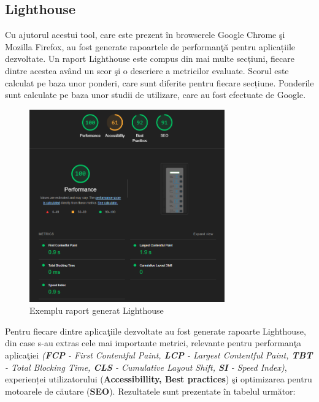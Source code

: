 \documentclass[12pt, a4paper]{report}
\begin{document}
\subsection{Lighthouse}

Cu ajutorul acestui tool, care este prezent în browserele Google Chrome \c si Mozilla Firefox, au fost generate rapoartele de performan\c t\u a pentru aplicațiile dezvoltate. Un raport Lighthouse este compus din mai multe secțiuni, fiecare dintre acestea av\^and un scor \c si o descriere a metricilor evaluate. Scorul este calculat pe baza unor ponderi, care sunt diferite pentru fiecare secțiune. Ponderile sunt calculate pe baza unor studii de utilizare, care au fost efectuate de Google.

\begin{figure}[htbp]
	\centering
	\includegraphics[width=0.75\textwidth]{01_mobile_lighthouse.png}
	\caption{Exemplu raport generat Lighthouse}
	\label{fig:lighthouse-example}
\end{figure}

Pentru fiecare dintre aplica\c tiile dezvoltate au fost generate rapoarte Lighthouse, din case s-au extras cele mai importante metrici, relevante pentru performan\c ta aplica\c tiei \textit{(\textbf{FCP} - First Contentful Paint, \textbf{LCP} - Largest Contentful Paint, \textbf{TBT} - Total Blocking Time, \textbf{CLS} - Cumulative Layout Shift, \textbf{SI} - Speed Index)}, experienței utilizatorului (\textbf{Accessibillity, Best practices}) \c si optimizarea pentru motoarele de căutare (\textbf{SEO}). Rezultatele sunt prezentate \^in tabelul urm\u ator:
\end{document}
